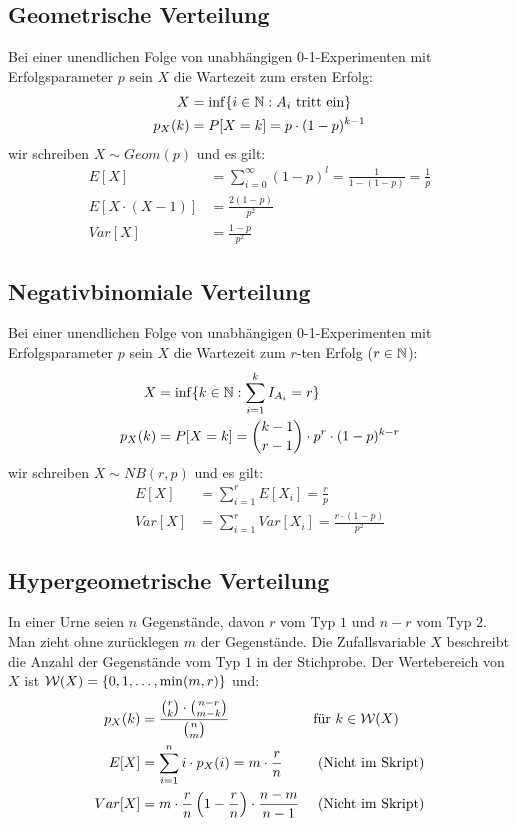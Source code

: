 \subsection*{Geometrische Verteilung}
Bei einer unendlichen Folge von unabhängigen 0-1-Experimenten mit
Erfolgsparameter $p$ sein $X$ die Wartezeit zum ersten Erfolg:
\begin{align*}
  X       & = \inf \{ i \in \mathbb{N} : A_i \text{ tritt ein} \} \\
  p_X (k) & = P[X = k] = p \cdot  (1-p)^{k-1}
\end{align*}
wir schreiben $X \sim Geom (p)$ und es gilt:
\begin{align*}
  E[X]              & = \sum_{i = 0}^\infty  (1-p)^l
  = \frac{1}{1- (1-p)} = \frac{1}{p}                 \\
  E[X \cdot  (X-1)] & = \frac{2 (1-p)}{p^2}          \\
  Var[X]            & = \frac{1-p}{p^2}
\end{align*}
\subsection*{Negativbinomiale Verteilung}
Bei einer unendlichen Folge von unabhängigen 0-1-Experimenten mit
Erfolgsparameter $p$ sein $X$ die Wartezeit zum $r$-ten Erfolg ($r \in \mathbb{N}$):
\begin{align*}
  X       & = \inf \{ k \in \mathbb{N} : \sum_{i = 1}^k I_{A_i} = r \}         \\
  p_X (k) & = P[X = k] = \binom{k-1}{r-1} \cdot p^r \cdot  (1-p)^{k-r}
\end{align*}
wir schreiben $X \sim NB (r, p)$ und es gilt:
\begin{align*}
  E[X]   & = \sum_{i = 1}^r E[X_i] = \frac{r}{p}                  \\
  Var[X] & = \sum_{i = 1}^r Var[X_i] = \frac{r \cdot  (1-p)}{p^2}
\end{align*}

\subsection*{Hypergeometrische Verteilung}
In einer Urne seien $n$ Gegenstände, davon $r$ vom Typ $1$ und $n-r$ vom Typ
$2$. Man zieht ohne zurücklegen $m$ der Gegenstände. Die Zufallsvariable $X$
beschreibt die Anzahl der Gegenstände vom Typ $1$ in der Stichprobe. Der
Wertebereich von $X$ ist $\mathcal{W} (X) = \{0, 1, \dots, \min (m, r)\}$ und:
\begin{align*}
  p_X (k) & = \frac{\binom{r}{k} \cdot \binom{n-r}{m-k}}{\binom{n}{m}}
          &                                                                                 & \text{für } k \in \mathcal{W} (X)                             \\
  E[X]    & = \sum_{i = 1}^n i \cdot p_X (i) = m \cdot \frac{r}{n}                                     &                          & \text{ (Nicht im Skript)} \\
  Var[X]  & = m \cdot \frac{r}{n} \left  (1 - \frac{r}{n} \right) \cdot \frac{n - m}{n - 1} &                          & \text{ (Nicht im Skript)}
\end{align*}
